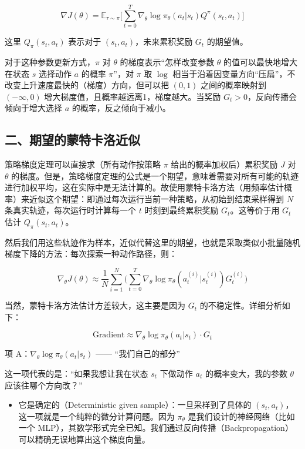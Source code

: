 \[
\nabla J(\theta)
=\mathbb{E}_{\tau\sim\pi}
\bigl[
\sum_{t=0}^{T}
\nabla_\theta\log\pi_\theta(a_t|s_t)Q^{\pi}(s_t,a_t)
\bigr]
\]

这里 \(Q_\pi(s_t,a_t)\) 表示对于 \((s_t,a_t)\)，未来累积奖励 \(G_t\) 的期望值。

对于这种参数更新方式，\(\pi\) 对 \(\theta\) 的梯度表示``怎样改变参数 \(\theta\) 的值可以最快地增大在状态 \(s\) 选择动作 \(a\) 的概率 \(\pi\)''，对 \(\pi\) 取 \(\log\) 相当于沿着因变量方向``压扁''，不改变上升速度最快的（梯度）方向，但可以把 \((0,1)\) 之间的概率映射到 \((-\infty,0)\) 增大梯度值，且概率越远离1，梯度越大。当奖励 \(G_t>0\)，反向传播会倾向于增大选择 \(a\) 的概率，反之倾向于减小。

\hypertarget{ux4e8cux671fux671bux7684ux8499ux7279ux5361ux6d1bux8fd1ux4f3c}{%
\subsection{二、期望的蒙特卡洛近似}\label{ux4e8cux671fux671bux7684ux8499ux7279ux5361ux6d1bux8fd1ux4f3c}}

策略梯度定理可以直接求（所有动作按策略 \(\pi\) 给出的概率加权后）累积奖励 \(J\) 对 \(\theta\) 的梯度。但是，策略梯度定理的公式是一个期望，意味着需要对所有可能的轨迹进行加权平均，这在实际中是无法计算的。故使用蒙特卡洛方法（用频率估计概率）来近似这个期望：即通过每次运行当前一种策略，从初始到结束采样得到 \(N\) 条真实轨迹，每次运行时计算每一个 \(t\) 时刻到最终累积奖励 \(G_t\)。这等价于用 \(G_t\) 估计 \(Q_\pi(s_t,a_t)\)。

然后我们用这些轨迹作为样本，近似代替这里的期望，也就是采取类似小批量随机梯度下降的方法：每次探索一种动作路径，则：

\[
\nabla_\theta J(\theta)
\approx
\frac{1}{N}\sum_{i=1}^{N}
\bigl(
\sum_{t=0}^{T}
\nabla_\theta\log\pi_\theta(a_t^{(i)}|s_t^{(i)})G_t^{(i)}
\bigr)
\]

当然，蒙特卡洛方法估计方差较大，这主要是因为 \(G_t\) 的不稳定性。详细分析如下：

\[
\text{Gradient}\approx\nabla_\theta\log\pi_\theta(a_t|s_t)\cdot G_t
\]

项 A：\(\nabla_\theta\log\pi_\theta(a_t|s_t)\) ------ ``我们自己的部分''

这一项代表的是：``如果我想让我在状态 \(s_t\) 下做动作 \(a_t\) 的概率变大，我的参数 \(\theta\) 应该往哪个方向改？''

\begin{itemize}
\tightlist
\item
  它是确定的（Deterministic given sample）：一旦采样到了具体的 \((s_t,a_t)\)，这一项就是一个纯粹的微分计算问题。因为 \(\pi_\theta\) 是我们设计的神经网络（比如一个 MLP），其数学形式完全已知。我们通过反向传播（Backpropagation）可以精确无误地算出这个梯度向量。
\end{itemize}

